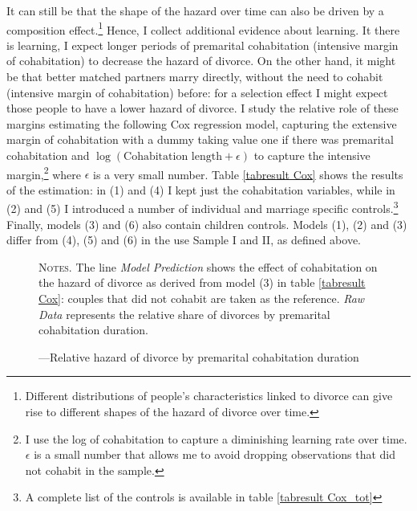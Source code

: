 \documentclass[12pt]{article}
\begin{document}
 It can still be that the shape of the hazard over time can also be driven by a composition effect.\footnote{Different distributions of people's characteristics linked to divorce can give rise to different shapes of the hazard of divorce over time.} Hence, I collect additional evidence about learning. It there is learning, I expect longer periods of premarital cohabitation (intensive margin of cohabitation) to decrease the hazard of divorce. On the other hand, it might be that better matched partners marry directly, without the need to cohabit (intensive margin of cohabitation) before: for a selection effect I might expect those people to have a lower hazard of divorce. I study the relative role of these margins estimating the following Cox regression model, capturing the extensive margin of cohabitation with a dummy taking value one if there was premarital cohabitation and $\log(\text{Cohabitation length}+\epsilon)$ to capture the intensive margin,\footnote{I use the log of cohabitation to capture a diminishing learning rate over time. $\epsilon$ is a small number that allows me to avoid dropping observations that did not cohabit in the sample.} where $\epsilon$ is a very small number. Table \ref{tabresult Cox} shows the results of the estimation: in (1) and (4) I kept just the cohabitation variables, while in (2) and (5) I introduced a number of individual and marriage specific controls.\footnote{A complete list of the controls is available in table \ref{tabresult Cox_tot}} Finally, models (3) and (6) also contain children controls. Models (1), (2) and (3) differ from (4), (5) and (6) in the use Sample I and II, as defined above.
\begin{figure}[h!]
	\centering
	\caption{---Relative hazard of divorce by premarital cohabitation duration}
	\label{fig:cohabitationeffect}
	\hspace*{-1.1cm} 
	\resizebox{0.9\textwidth}{!}{}
	\begin{minipage}{0.99\textwidth} %
		
		\hspace{30em}
		
		{\footnotesize \textsc{Notes.}  The line \textit{Model Prediction} shows the effect of cohabitation on the hazard of divorce as derived from model (3) in table \ref{tabresult Cox}: couples that did not cohabit are taken as the reference. \textit{Raw Data} represents the relative share of divorces by premarital cohabitation duration.\par}
	\end{minipage}
\end{figure}
\end{document}
